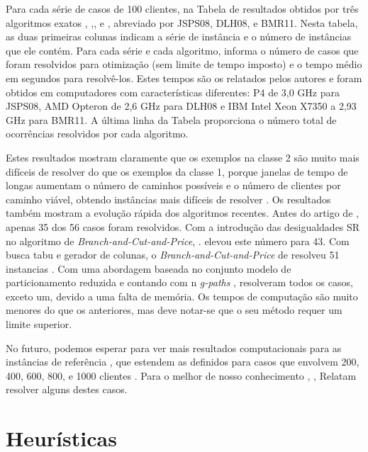 Para cada série de casos de 100 clientes, na Tabela de resultados obtidos por três algoritmos exatos , \cite{jepsen13},\cite{desaulniers14}, e \cite{baldacci11}, abreviado por JSPS08, DLH08, e BMR11. Nesta tabela, as duas primeiras colunas indicam a série de instância e o número de instâncias que ele contém. Para cada série e cada algoritmo, informa o número de casos que foram resolvidos para otimização (sem limite de tempo imposto) e o tempo médio em segundos para resolvê-los. Estes tempos são os relatados pelos autores e foram obtidos em computadores com características diferentes: P4 de 3,0 GHz para JSPS08, AMD Opteron de 2,6 GHz para DLH08 e IBM Intel Xeon X7350 a 2,93 GHz para BMR11. A última linha da Tabela proporciona o número total de ocorrências resolvidos por cada algoritmo.

Estes resultados mostram claramente que os exemplos na classe 2 são muito mais difíceis de resolver do que os exemplos da classe 1, porque janelas de tempo de longas aumentam o número de caminhos possíveis e o número de clientes por caminho viável, obtendo instâncias mais difíceis de resolver . Os resultados também mostram a evolução rápida dos algoritmos recentes. Antes do artigo de \cite{jepsen13}, apenas 35 dos 56 casos foram resolvidos. Com a introdução das desigualdades SR no algoritmo de \textit{Branch-and-Cut-and-Price}, \cite{jepsen13}. elevou este número para 43. Com busca tabu e gerador de colunas, o \textit{Branch-and-Cut-and-Price} de \cite{desaulniers14} resolveu 51 instancias . Com uma abordagem baseada no conjunto modelo de particionamento reduzida e contando com n \textit{g-paths} , \cite{baldacci11} resolveram todos os casos, exceto um, devido a uma falta de memória. Os tempos de computação são muito menores do que os anteriores, mas deve notar-se que o seu método requer um limite superior.

No futuro, podemos esperar para ver mais resultados computacionais para as instâncias de referência \cite{gehring09}, que estendem as definidos para casos que envolvem 200, 400, 600, 800, e 1000 clientes . Para o melhor de nosso conhecimento \cite{larsen00},\cite{braysy02} \cite{cook99}, \cite{kallehauge06} Relatam resolver alguns destes casos.
 
\section{Heurísticas}

